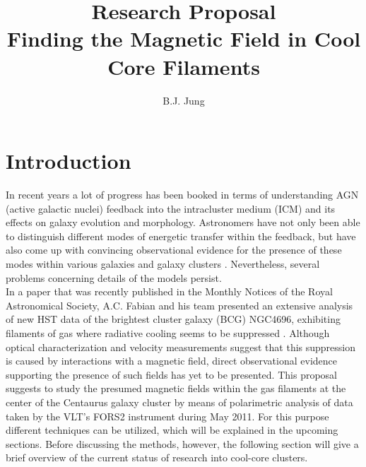 \documentclass[twoside,single]{lion-msc}
\title{Research Proposal \\ \small{\textbf{Finding the Magnetic Field in Cool Core Filaments}}}
\author{B.J. Jung}
\affiliation{Leiden Observatory, Leiden University}
\begin{document}
\maketitle






\chapter{Introduction}

    \par In recent years a lot of progress has been booked in terms of understanding AGN (active galactic nuclei) feedback into the intracluster medium (ICM) and its effects on galaxy evolution and morphology. Astronomers have not only been able to distinguish different modes of energetic transfer within the feedback, but have also come up with convincing observational evidence for the presence of these modes within various galaxies and galaxy clusters \citep{Fabian2012}. Nevertheless, several problems concerning details of the models persist. \\
    In a paper that was recently published in the Monthly Notices of the Royal Astronomical Society, A.C. Fabian and his team presented an extensive analysis of new HST data of the brightest cluster galaxy (BCG) NGC4696, exhibiting filaments of gas where radiative cooling seems to be suppressed \citep{Fabian2016}. Although optical characterization and velocity measurements suggest that this suppression is caused by interactions with a magnetic field, direct observational evidence supporting the presence of such fields has yet to be presented. This proposal suggests to study the presumed magnetic fields within the gas filaments at the center of the Centaurus galaxy cluster by means of polarimetric analysis of data taken by the VLT's FORS2 instrument during May 2011. For this purpose different techniques can be utilized, which will be explained in the upcoming sections. Before discussing the methods, however, the following section will give a brief overview of the current status of research into cool-core clusters. \\
    
\end{document}
